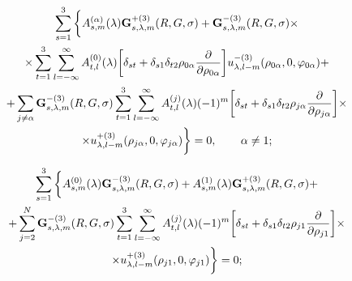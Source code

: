 \begin{multline}
\sum\limits_{s = 1}^3 \bigg\{  A_{s,m}^{(\alpha )}(\lambda ){\bf{G}}_{s,\lambda ,m}^{ + (3)}(R,G,\sigma ) + {\bf{G}}_{s,\lambda ,m}^{ - (3)}(R,G,\sigma ) \times \\
\times \sum\limits_{t = 1}^3 {\sum\limits_{l =  - \infty }^\infty  {A_{t,l}^{(0)}} } (\lambda )\bigg[{\delta _{st}} + {\delta _{s1}}{\delta _{t2}}{\rho _{0\alpha }}\frac{\partial }{{\partial {\rho _{0\alpha }}}}\bigg]u_{\lambda ,l - m}^{ - (3)}({\rho _{0\alpha }},0,{\varphi _{0\alpha }}) + \\
+ \sum\limits_{j \ne \alpha } {{\bf{G}}_{s,\lambda ,m}^{ - (3)}} (R,G,\sigma )\sum\limits_{t = 1}^3 {\sum\limits_{l =  - \infty }^\infty  {A_{t,l}^{(j)}} } (\lambda ){( - 1)^m}\bigg[{\delta _{st}} + {\delta _{s1}}{\delta _{t2}}{\rho _{j\alpha }}\frac{\partial }{{\partial {\rho _{j\alpha }}}}\bigg] \times \\
\times u_{\lambda ,l - m}^{ + (3)}({\rho _{j\alpha }},0,{\varphi _{j\alpha }})\bigg\}  = 0,\qquad {\kern 1pt} \alpha  \ne 1;
\label{eq:7:23}
\end{multline}

\begin{multline}
\sum\limits_{s = 1}^3 \bigg\{  A_{s,m}^{(0)}(\lambda ){\bf{G}}_{s,\lambda ,m}^{ - (3)}(R,G,\sigma ) + A_{s,m}^{(1)}(\lambda ){\bf{G}}_{s,\lambda ,m}^{ + (3)}(R,G,\sigma ) + \\
+ \mathop \sum \limits_{j = 2}^N {\bf{G}}_{s,\lambda ,m}^{ - (3)}(R,G,\sigma )\sum\limits_{t = 1}^3 {\sum\limits_{l =  - \infty }^\infty  {A_{t,l}^{(j)}} } (\lambda ){( - 1)^m}\bigg[{\delta _{st}} + {\delta _{s1}}{\delta _{t2}}{\rho _{j1}}\frac{\partial }{{\partial {\rho _{j1}}}}\bigg] \times \\
\times u_{\lambda ,l - m}^{ + (3)}({\rho _{j1}},0,{\varphi _{j1}})\bigg\}  = 0;
\label{eq:7:24}
\end{multline}

